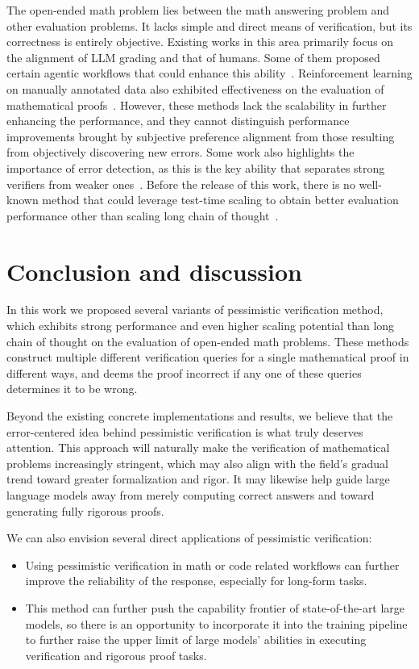\documentclass{article} %
\begin{document}
The open-ended math problem lies between the math answering problem and other evaluation problems. It lacks simple and direct means of verification, but its correctness is entirely objective. Existing works in this area primarily focus on the alignment of LLM grading and that of humans. Some of them proposed certain agentic workflows that could enhance this ability~\citep{mahdavi_refgrader_2025, mahdavi_scaling_2025}. Reinforcement learning on manually annotated data also exhibited effectiveness on the evaluation of mathematical proofs~\citep{dekoninck_open_2025}. However, these methods lack the scalability in further enhancing the performance, and they cannot distinguish performance improvements brought by subjective preference alignment from those resulting from objectively discovering new errors. Some work also highlights the importance of error detection, as this is the key ability that separates strong verifiers from weaker ones~\citep{pandit_hard2verify_2025}. Before the release of this work, there is no well-known method that could leverage test-time scaling to obtain better evaluation performance other than scaling long chain of thought~\citep{pandit_hard2verify_2025}.

\section{Conclusion and discussion}

In this work we proposed several variants of pessimistic verification method, which exhibits strong performance and even higher scaling potential than long chain of thought on the evaluation of open-ended math problems. These methods construct multiple different verification queries for a single mathematical proof in different ways, and deems the proof incorrect if any one of these queries determines it to be wrong.

Beyond the existing concrete implementations and results, we believe that the error-centered idea behind pessimistic verification is what truly deserves attention. This approach will naturally make the verification of mathematical problems increasingly stringent, which may also align with the field’s gradual trend toward greater formalization and rigor. It may likewise help guide large language models away from merely computing correct answers and toward generating fully rigorous proofs.

We can also envision several direct applications of pessimistic verification:

\begin{itemize}
  \item Using pessimistic verification in math or code related workflows can further improve the reliability of the response, especially for long-form tasks.
  \item This method can further push the capability frontier of state-of-the-art large models, so there is an opportunity to incorporate it into the training pipeline to further raise the upper limit of large models’ abilities in executing verification and rigorous proof tasks.
\end{itemize}
\end{document}
